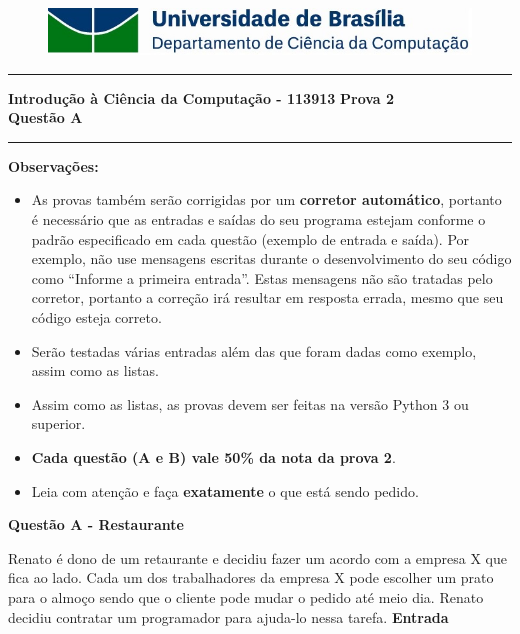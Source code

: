 \documentclass[a4paper, 12pt]{article}
\begin{document}
\begin{figure}[H]
	\includegraphics[scale=0.9]{UnB_CiC_Logo.jpg}
\end{figure}
\noindent\rule{\textwidth}{0.4pt}
\begin{center}
	\textbf{{\Large Introdução à Ciência da Computação - 113913}} \newline \newline
	\textbf{{\large Prova 2} \\
	\vspace{9pt}
	{\large Questão A}} \\
	\noindent\rule{\textwidth}{0.4pt}
	\newline
\end{center}

\textbf{{\large Observações:}}
\begin{itemize}
	\item As provas também serão corrigidas por um \textbf{corretor automático}, portanto é necessário que as entradas e saídas do seu programa estejam conforme o padrão especificado em cada questão (exemplo de entrada e saída). Por exemplo, não use mensagens escritas durante o desenvolvimento do seu código como “Informe a primeira entrada”. Estas mensagens não são tratadas pelo corretor, portanto a correção irá resultar em resposta errada, mesmo que seu código esteja correto.
	\item Serão testadas várias entradas além das que foram dadas como exemplo, assim como as listas.
	\item Assim como as listas, as provas devem ser feitas na versão Python 3 ou superior.
	\item \textbf{Cada questão (A e B) vale 50\% da nota da prova 2}.
	\item Leia com atenção e faça \textbf{exatamente} o que está sendo pedido.
\end{itemize}
\newpage %
\begin{center}
\textbf{{\Large Questão A - Restaurante}}
\end{center}
\vspace{5pt}

Renato é dono de um retaurante e decidiu fazer um acordo com a empresa X que fica ao lado. Cada um dos trabalhadores da empresa X pode escolher um prato para o almoço sendo que o cliente pode mudar o pedido até meio dia. Renato decidiu contratar um programador para ajuda-lo nessa tarefa.
\newline \newline
\textbf{{\large Entrada}} \newline
\end{document}
